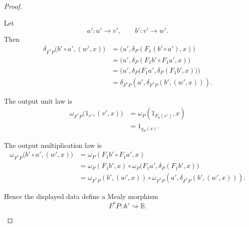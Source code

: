 \begin{proof}
\begin{enumerate}
        Let
        \[
            a':u'\to v',
            \qquad
            b':v'\to w'.
        \]
        Then
        \[
        \begin{aligned}
            \delta_{F^*P}
            \bigl(
                b'\circ a',
                (w',x)
            \bigr)
            &=
            \bigl(
                u',
                \delta_P(F_1(b'\circ a'),x)
            \bigr)
            \\
            &=
            \bigl(
                u',
                \delta_P(F_1b'\circ F_1a',x)
            \bigr)
            \\
            &=
            \bigl(
                u',
                \delta_P
                \bigl(
                    F_1a',
                    \delta_P(F_1b',x)
                \bigr)
            \bigr)
            \\
            &=
            \delta_{F^*P}
            \left(
                a',
                \delta_{F^*P}(b',(w',x))
            \right).
        \end{aligned}
        \]

        The output unit law is
        \[
        \begin{aligned}
            \omega_{F^*P}
            \bigl(
                1_{v'},
                (v',x)
            \bigr)
            &=
            \omega_P(1_{F_0(v')},x)
            \\
            &=
            1_{q_P(x)}.
        \end{aligned}
        \]

        The output multiplication law is
        \[
        \begin{aligned}
            \omega_{F^*P}
            \bigl(
                b'\circ a',
                (w',x)
            \bigr)
            &=
            \omega_P(F_1b'\circ F_1a',x)
            \\
            &=
            \omega_P(F_1b',x)
            \circ
            \omega_P
            \bigl(
                F_1a',
                \delta_P(F_1b',x)
            \bigr)
            \\
            &=
            \omega_{F^*P}(b',(w',x))
            \circ
            \omega_{F^*P}
            \left(
                a',
                \delta_{F^*P}(b',(w',x))
            \right).
        \end{aligned}
        \]

        Hence the displayed data define a Mealy morphism
        \[
            F^*P:\mathbb A'\rightsquigarrow\mathbb B.
        \]


\end{enumerate}
\end{proof}

